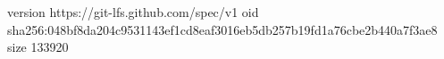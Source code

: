 version https://git-lfs.github.com/spec/v1
oid sha256:048bf8da204c9531143ef1cd8eaf3016eb5db257b19fd1a76cbe2b440a7f3ae8
size 133920
